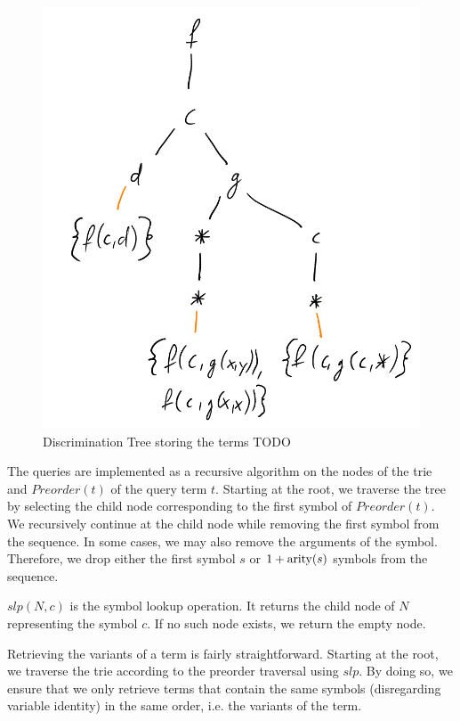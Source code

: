 \begin{figure}[h]
\centering
\includegraphics[scale=0.25]{figures/disc_net.png}
\caption{Discrimination Tree storing the terms TODO}
\label{discnet}
\end{figure}

The queries are implemented as a recursive algorithm on the nodes of the trie and $Preorder(t)$ of the query term $t$. Starting at the root, we traverse the tree by selecting the child node corresponding to the first symbol of $Preorder(t)$. We recursively continue at the child node while removing the first symbol from the sequence. In some cases, we may also remove the arguments of the symbol. Therefore, we drop either the first symbol $s$ or $1 + \mathrm{arity}(s)$ symbols from the sequence.

\begin{defn}
  $slp(N,c)$ is the symbol lookup operation. It returns the child node of $N$ representing the symbol $c$. If no such node exists, we return the empty node.
\end{defn}

Retrieving the variants of a term is fairly straightforward. Starting at the root, we traverse the trie according to the preorder traversal using $slp$. By doing so, we ensure that we only retrieve terms that contain the same symbols (disregarding variable identity) in the same order, i.e. the variants of the term.

